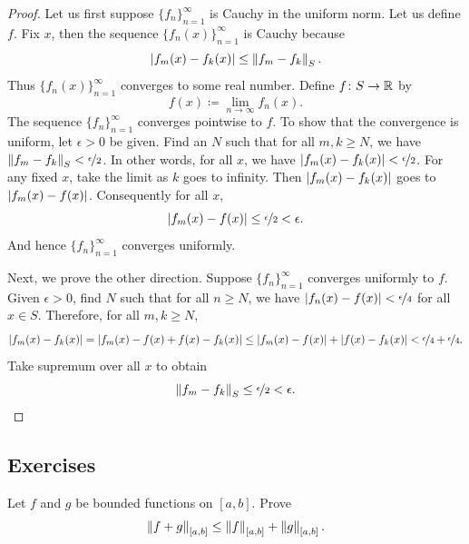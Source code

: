 \begin{proof}
Let us first suppose $\{ f_n \}_{n=1}^\infty$ is Cauchy in the uniform norm.
Let us define $f$.  Fix $x$, then
the sequence $\bigl\{ f_n(x) \bigr\}_{n=1}^\infty$ is Cauchy because
\begin{equation*}
\left\lvert {f_m(x)-f_k(x)} \right\rvert
\leq
\left\lVert {f_m-f_k} \right\rVert_S .
\end{equation*}
Thus $\bigl\{ f_n(x) \bigr\}_{n=1}^\infty$ converges to some real number.  Define $f \colon S
\to {\mathbb{R}}$ by
\begin{equation*}
f(x) \coloneqq \lim_{n \to \infty} f_n(x) .
\end{equation*}
The sequence
$\{ f_n \}_{n=1}^\infty$ converges pointwise to $f$.  To show that the convergence
is uniform, let $\epsilon > 0$ be given.  Find an $N$ such that
for all $m, k \geq N$, we have
$\left\lVert {f_m-f_k} \right\rVert_S < \nicefrac{\epsilon}{2}$.  In other words, for
all $x$, we have
$\left\lvert {f_m(x)-f_k(x)} \right\rvert < \nicefrac{\epsilon}{2}$.  For any fixed $x$, take the limit
as $k$ goes to infinity.  Then $\left\lvert {f_m(x)-f_k(x)} \right\rvert$
goes to $\left\lvert {f_m(x)-f(x)} \right\rvert$.
Consequently for all $x$,
\begin{equation*}
\left\lvert {f_m(x)-f(x)} \right\rvert \leq \nicefrac{\epsilon}{2} < \epsilon .
\end{equation*}
And hence $\{ f_n \}_{n=1}^\infty$ converges uniformly.

Next, we prove the other direction.
Suppose $\{ f_n \}_{n=1}^\infty$ converges uniformly to
$f$.  Given $\epsilon > 0$, find $N$ such that for all $n \geq N$,
we have $\left\lvert {f_n(x)-f(x)} \right\rvert < \nicefrac{\epsilon}{4}$ for all $x \in S$.
Therefore, for all $m, k \geq N$,
\begin{equation*}
\left\lvert {f_m(x)-f_k(x)} \right\rvert = 
\left\lvert {f_m(x)-f(x)+f(x)-f_k(x)} \right\rvert \leq
\left\lvert {f_m(x)-f(x)} \right\rvert+\left\lvert {f(x)-f_k(x)} \right\rvert < \nicefrac{\epsilon}{4} +
\nicefrac{\epsilon}{4} .
\end{equation*}
Take supremum over all $x$ to obtain
\begin{equation*}
\left\lVert {f_m-f_k} \right\rVert_S \leq \nicefrac{\epsilon}{2} < \epsilon .  \qedhere
\end{equation*}
\end{proof}

\subsection{Exercises}

\begin{exercise}
Let $f$ and $g$ be bounded functions on $[a,b]$.  Prove 
\begin{equation*}
\left\lVert {f+g} \right\rVert_{[a,b]} \leq \left\lVert {f} \right\rVert_{[a,b]} + \left\lVert {g} \right\rVert_{[a,b]} .
\end{equation*}
\end{exercise}

